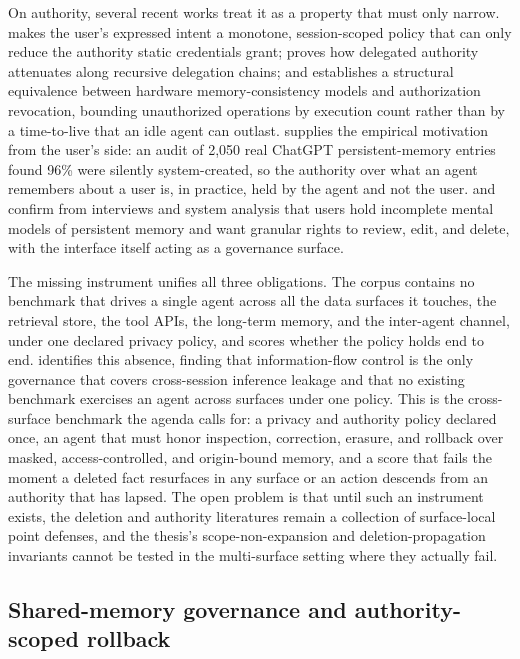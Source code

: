 On authority, several recent works treat it as a property that must only
narrow. \citet{zhu2026intentgovernedauth} makes the user's expressed intent a
monotone, session-scoped policy that can only reduce the authority static credentials
grant; \citet{ibrahim2026overlaygovernance} proves how delegated authority attenuates
along recursive delegation chains; and \citet{parakhin2026bureaucracy} establishes a
structural equivalence between hardware memory-consistency models and authorization
revocation, bounding unauthorized operations by execution count rather than by a
time-to-live that an idle agent can outlast. \citet{dash2026selfportrait} supplies
the empirical motivation from the user's side: an audit of 2{,}050 real ChatGPT
persistent-memory entries found 96\% were silently system-created, so the authority
over what an agent remembers about a user is, in practice, held by the agent and not
the user. \citet{zhang2025ragmemoryperceptions} and \citet{feng2025regulatoryui}
confirm from interviews and system analysis that users hold incomplete mental models
of persistent memory and want granular rights to review, edit, and delete, with the
interface itself acting as a governance surface.

The missing instrument unifies all three obligations. The corpus contains no
benchmark that drives a single agent across all the data surfaces it touches, the
retrieval store, the tool APIs, the long-term memory, and the inter-agent channel,
under one declared privacy policy, and scores whether the policy holds end to end.
\citet{lahjouji2026privacysurvey} identifies this absence, finding that
information-flow control is the only governance that covers cross-session inference
leakage and that no existing benchmark exercises an agent across surfaces under one
policy. This is the cross-surface benchmark the agenda calls for: a privacy and
authority policy declared once, an agent that must honor inspection, correction,
erasure, and rollback over masked, access-controlled, and origin-bound memory, and a
score that fails the moment a deleted fact resurfaces in any surface or an action
descends from an authority that has lapsed. The open problem is that until such an
instrument exists, the deletion and authority literatures remain a collection of
surface-local point defenses, and the thesis's scope-non-expansion and
deletion-propagation invariants cannot be tested in the multi-surface setting where
they actually fail.

\subsection{Shared-memory governance and authority-scoped rollback}

